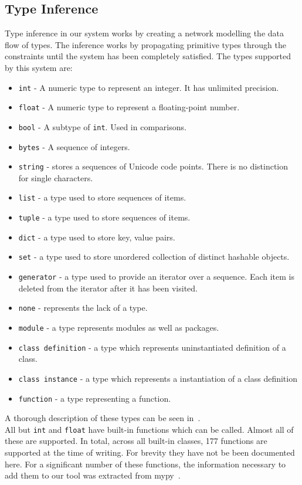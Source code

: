 \documentclass[12pt, titlepage]{article}
\begin{document}
\subsection{Type Inference}
Type inference in our system works by creating a network modelling the data flow of types. The inference works by propagating primitive types through the constraints until the system has been completely satisfied. The types supported by this system are:
\begin{itemize}
	\item \texttt{int} - A numeric type to represent an integer. It has unlimited precision.
	\item \texttt{float} - A numeric type to represent a floating-point number.
	\item \texttt{bool} - A subtype of \texttt{int}. Used in comparisons.
	\item \texttt{bytes} - A sequence of integers.
	\item \texttt{string} - stores a sequences of Unicode code points. There is no distinction for single characters.
	\item \texttt{list} - a type used to store sequences of items.
	\item \texttt{tuple} - a type used to store sequences of items.
	\item \texttt{dict} - a type used to store key, value pairs.
	\item \texttt{set} - a type used to store unordered collection of distinct hashable objects.
	\item \texttt{generator} - a type used to provide an iterator over a sequence. Each item is deleted from the iterator after it has been visited.
	\item \texttt{none} - represents the lack of a type.
	\item \texttt{module} - a type represents modules as well as packages.
	\item \texttt{class definition} - a type which represents uninstantiated definition of a class.
	\item \texttt{class instance} - a type which represents a instantiation of a class definition
	\item \texttt{function} - a type representing a function.
\end{itemize}
A thorough description of these types can be seen in~\cite{pythonTypeDocs}. \\
\indent All but \texttt{int} and \texttt{float} have built-in functions which can be called. Almost all of these are supported. In total, across all built-in classes, 177 functions are supported at the time of writing. For brevity they have not be been documented here. For a significant number of these functions, the information necessary to add them to our tool was extracted from mypy~\cite{mypy}. \\
\end{document}
